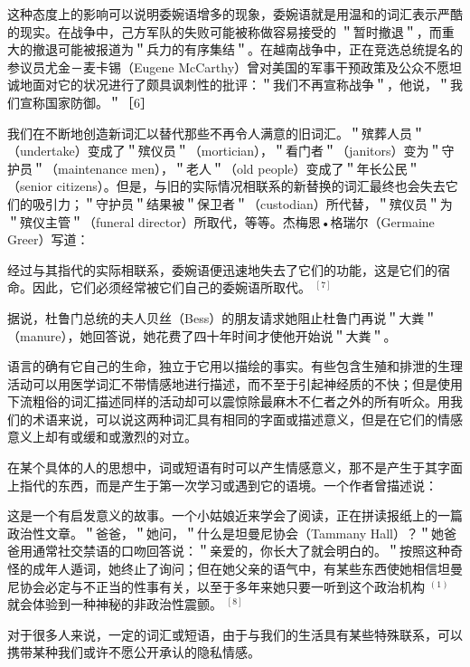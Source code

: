 这种态度上的影响可以说明委婉语增多的现象，委婉语就是用温和的词汇表示严酷的现实。在战争中，己方军队的失败可能被称做容易接受的 ＂暂时撤退＂，而重大的撤退可能被报道为＂兵力的有序集结＂。在越南战争中，正在竞选总统提名的参议员尤金－麦卡锡（Eugene McCarthy）曾对美国的军事干预政策及公众不愿坦诚地面对它的状况进行了颇具讽刺性的批评：＂我们不再宣称战争＂，他说，＂我们宣称国家防御。＂［6］

我们在不断地创造新词汇以替代那些不再令人满意的旧词汇。＂殡葬人员＂（undertake）变成了＂殡仪员＂（mortician），＂看门者＂（janitors）变为＂守护员＂（maintenance men），＂老人＂（old people）变成了＂年长公民＂（senior citizens）。但是，与旧的实际情况相联系的新替换的词汇最终也会失去它们的吸引力；＂守护员＂结果被＂保卫者＂（custodian）所代替，＂殡仪员＂为＂殡仪主管＂（funeral director）所取代，等等。杰梅恩•格瑞尔（Germaine Greer）写道：

\begin{displayquote}
经过与其指代的实际相联系，委婉语便迅速地失去了它们的功能，这是它们的宿命。因此，它们必须经常被它们自己的委婉语所取代。 ${ }^{[7]}$
\end{displayquote}

据说，杜鲁门总统的夫人贝丝（Bess）的朋友请求她阻止杜鲁门再说＂大粪＂（manure），她回答说，她花费了四十年时间才使他开始说＂大粪＂。

语言的确有它自己的生命，独立于它用以描绘的事实。有些包含生殖和排泄的生理活动可以用医学词汇不带情感地进行描述，而不至于引起神经质的不快；但是使用下流粗俗的词汇描述同样的活动却可以震惊除最麻木不仁者之外的所有听众。用我们的术语来说，可以说这两种词汇具有相同的字面或描述意义，但是在它们的情感意义上却有或缓和或激烈的对立。

在某个具体的人的思想中，词或短语有时可以产生情感意义，那不是产生于其字面上指代的东西，而是产生于第一次学习或遇到它的语境。一个作者曾描述说：

\begin{displayquote}
这是一个有启发意义的故事。一个小姑娘近来学会了阅读，正在拼读报纸上的一篇政治性文章。＂爸爸，＂她问，＂什么是坦曼尼协会（Tammany Hall）？＂她爸爸用通常社交禁语的口吻回答说：＂亲爱的，你长大了就会明白的。＂按照这种奇怪的成年人遁词，她终止了询问；但在她父亲的语气中，有某些东西使她相信坦曼尼协会必定与不正当的性事有关，以至于多年来她只要一听到这个政治机构 ${ }^{(1)}$ 就会体验到一种神秘的非政治性震颤。 ${ }^{[8]}$
\end{displayquote}

对于很多人来说，一定的词汇或短语，由于与我们的生活具有某些特殊联系，可以携带某种我们或许不愿公开承认的隐私情感。

